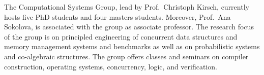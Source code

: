 The Computational Systems Group, lead by Prof.~Christoph Kirsch, currently hosts five PhD students and four masters students. Moreover, Prof.~Ana Sokolova, is associated with the group as associate professor. The research focus of the group is on principled engineering of concurrent data structures and memory management systems and benchmarks as well as on probabilistic systems and co-algebraic structures. The group offers classes and seminars on compiler construction, operating systems, concurrency, logic, and verification.